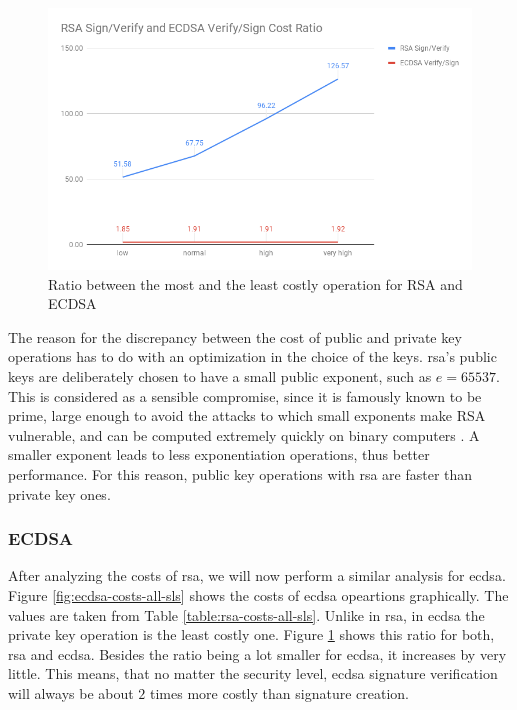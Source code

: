 \documentclass{llncs}
\begin{document}
\begin{figure}
  \centering
  \includegraphics[width=1.0\textwidth]{img/rsa_ecdsa_operation_ratio.png}
  \caption{\label{fig:rsa-ecdsa-pub-priv-ratio} Ratio between the most and the least costly operation for RSA and ECDSA}
\end{figure}

The reason for the discrepancy between the cost of public and private key operations has to do with an optimization
in the choice of the keys. \gls{rsa}'s public keys are deliberately chosen to have a small public exponent, such as $e=65537$. This is considered as a
sensible compromise, since it is famously known to be prime, large enough to avoid the attacks to which 
small exponents make RSA vulnerable, and can be computed extremely quickly on binary computers \cite{boneh2002fast}\cite{muir2006seifert}.
A smaller exponent leads to less exponentiation operations, thus better performance. For this reason, public
key operations with \gls{rsa} are faster than private key ones.

\subsubsection{ECDSA}

After analyzing the costs of \gls{rsa}, we will now perform a similar analysis for \gls{ecdsa}. Figure \ref{fig:ecdsa-costs-all-sls}
shows the costs of \gls{ecdsa} opeartions graphically. The values are taken from Table \ref{table:rsa-costs-all-sls}. Unlike in \gls{rsa}, 
in \gls{ecdsa} the private key operation is the least costly one. Figure \ref{fig:rsa-ecdsa-pub-priv-ratio} shows this ratio for both, 
\gls{rsa} and \gls{ecdsa}. Besides the ratio being a lot smaller for \gls{ecdsa}, it increases by very little. This means, that no matter
the security level, \gls{ecdsa} signature verification will always be about $2$ times more costly than signature creation.
\end{document}
